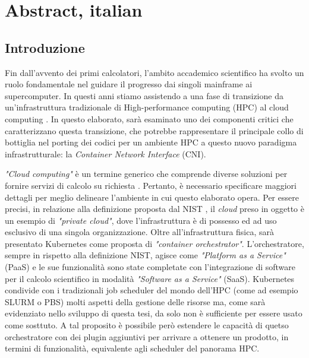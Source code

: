 \chapter{Abstract, italian}

\section*{Introduzione}

Fin dall'avvento dei primi calcolatori, l'ambito accademico scientifico ha
svolto un ruolo fondamentale nel guidare il progresso dai singoli mainframe ai
supercomputer.
In questi anni stiamo assistendo a una fase di transizione da un'infrastruttura
tradizionale di High-performance computing (HPC) al cloud computing
\cite{Surbiryala2019CloudCH}.
In questo elaborato, sarà esaminato uno dei componenti critici che
caratterizzano questa transizione, che potrebbe rappresentare il principale
collo di bottiglia nel porting dei codici per un ambiente HPC a questo nuovo
paradigma infrastrutturale: la \textit{Container Network Interface} (CNI).


\textit{"Cloud computing"} è un termine generico che comprende diverse soluzioni per
fornire servizi di calcolo su richiesta \cite{rajkumar2011}.
Pertanto, è necessario specificare maggiori dettagli per meglio delineare
l'ambiente in cui questo elaborato opera.
Per essere precisi, in relazione alla definizione proposta dal NIST
\cite{nistdef}, il \textit{cloud} preso in oggetto è un esempio di
\textit{"private cloud"}, dove l'infrastruttura è di possesso ed ad uso
esclusivo di una singola organizzazione.
Oltre all'infrastruttura fisica, sarà presentato Kubernetes come proposta di
\textit{"container orchestrator"}.
L'orchestratore, sempre in rispetto alla definizione NIST, agisce come
\textit{"Platform as a Service"} (PaaS) e le sue funzionalità sono state
completate con l'integrazione di software per il calcolo scientifico in modalità
\textit{"Software as a Service"} (SaaS).
Kubernetes condivide con i tradizionali job scheduler del mondo dell'HPC
(come ad esempio SLURM o PBS) molti aspetti della gestione delle risorse ma,
come sarà evidenziato nello sviluppo di questa tesi, da solo non è sufficiente
per essere usato come sosttuto. A tal proposito è possibile però estendere le
capacità di quetso orchestratore con dei plugin aggiuntivi per arrivare a
ottenere un prodotto, in termini di funzionalità, equivalente agli scheduler del
panorama HPC.


